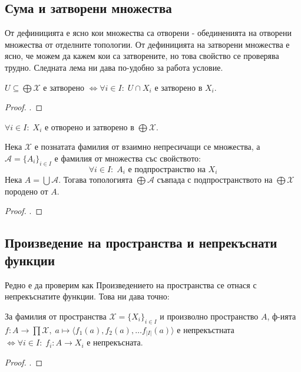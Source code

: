 \subsection{Сума и затворени множества}
От дефиницията е ясно кои множества са отворени - обединенията на отворени множества от отделните топологии. От дефиницията на затворени множества е ясно, че можем да кажем кои са затворените, но това свойство се проверява трудно. Следната лема ни дава по-удобно за работа условие.
\begin{lemma}
    $U \subseteq \bigoplus \mathcal X$ е затворено $\iff \forall i \in I:\; U \cap X_i$ е затворено в $X_i$.
\end{lemma}
\begin{proof}
    \cite[p.~74]{engelking1989general}.
\end{proof}

\begin{corollary}
    $\forall i \in I:\; X_i$ е отворено и затворено в $\bigoplus \mathcal X$.
\end{corollary}
\begin{proposition}
    Нека $\mathcal X$ е познатата фамилия от взаимно непресичащи се множества, а $\mathcal A = \{A_i\}_{i \in I}$ е фамилия от множества със свойството:
    \begin{equation*}
        \forall i\in I:\; A_i \text{ е подпространство на } X_i
    \end{equation*}
    Нека $A = \bigcup \mathcal A$. Тогава топологията $\bigoplus \mathcal A$ съвпада с подпространството на $\bigoplus \mathcal X$ породено от $A$.
\end{proposition}
\begin{proof}
    \cite[p.~75]{engelking1989general}.
\end{proof}

\subsection{Произведение на пространства и непрекъснати функции}
Редно е да проверим как Произведението на пространства се отнася с непрекъснатите функции. Това ни дава точно:
\begin{theorem}\label{th:sum-continuous}
    За фамилия от пространства $\mathcal X = \{X_i\}_{i \in I}$ и произволно пространство $A$, ф-ията $f : A \to \prod \mathcal X,\; a \mapsto \langle f_1(a), f_2(a), \dots f_{|I|}(a) \rangle$ е непрекъстната $\iff \forall i \in I:\; f_i: A \to X_i$ е непрекъсната.
\end{theorem}
\begin{proof}
    \cite[p.~110]{munkrestopology}.
\end{proof}
